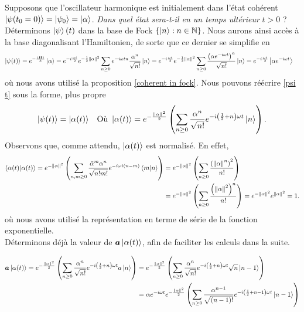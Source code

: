 \documentclass[11pt,oneside,a4paper]{article}
\newcommand{\h}{\ensuremath{\hbar}}
\begin{document}
Supposons que l'oscillateur harmonique est initialement dans l'état cohérent $\ket{\psi (t_0 = 0)} = \ket{\psi_0} = \ket{\alpha}$. \emph{Dans quel état sera-t-il en un temps ultérieur} $t>0$ ? Déterminons $\ket{\psi} (t)$ dans la base de Fock $\left\{\ket{n} : n\in\mathbb{N}\right\}$. Nous aurons ainsi accès à la base diagonalisant l'Hamiltonien, de sorte que ce dernier se simplifie en
\begin{align}
  \ket{\psi(t)} = e^{-\frac{i\bm{H}t}{\h}}\ket{\alpha} &= e^{-i\frac{\omega t}{2}}e^{-\frac{1}{2}\norm{\alpha}^2}\sum_{n\geq 0}e^{-i\omega tn}\frac{\alpha^n}{\sqrt{n!}}\ket{n}
  = e^{-i\frac{\omega t}{2}}e^{-\frac{1}{2}\norm{\alpha}^2}\sum_{n\geq 0}\frac{\left(\alpha e^{-i\omega t}\right)^n}{\sqrt{n!}}\ket{n}
  = e^{-i\frac{\omega t}{2}}\ket{\alpha e^{-i\omega t}}\label{psi t}
\end{align}
où nous avons utilisé la proposition \eqref{coherent in fock}. Nous pouvons réécrire \eqref{psi t} sous la forme, plus propre
\begin{align*}
  \ket{\psi(t)} &= \ket{\alpha(t)} &\text{Où }\ket{\alpha(t)} = e^{-\frac{\norm{\alpha}^2}{2}}\left(\sum_{n\geq 0}\frac{\alpha^n}{\sqrt{n!}}e^{-i\left(\frac{1}{2}+n\right)\omega t}\ket{n}\right).
\end{align*}
Observons que, comme attendu, $\ket{\alpha(t)}$ est normalisé. En effet,
\begin{align*}
  \braket{\alpha(t)} = e^{-\norm{\alpha}^2}\left(\sum_{n,m\geq 0}\frac{\bar{\alpha}^m\alpha^n}{\sqrt{n!m!}}e^{-i\omega t\left(n-m\right)}\braket{m}{n}\right)
  &= e^{-\norm{\alpha}^2}\left(\sum_{n\geq 0}\frac{\left(\norm{\alpha}^n\right)^2}{n!}\right)\\
  &= e^{-\norm{\alpha}^2}\left(\sum_{n\geq 0}\frac{\left(\norm{\alpha}^2\right)^n}{n!}\right) = e^{-\norm{\alpha}^2}e^{\norm{\alpha}^2} = 1.
\end{align*}
où nous avons utilisé la représentation en terme de série de la fonction exponentielle.\\

Déterminons déjà la valeur de $\bm{a}\ket{\alpha(t)}$, afin de faciliter les calculs dans la suite. 

\begin{align*}
  \bm{a}\ket{\alpha(t)} = e^{-\frac{\norm{\alpha}^2}{2}}\left(\sum_{n\geq 0}\frac{\alpha^n}{\sqrt{n!}}e^{-i\left(\frac{1}{2}+n\right)\omega t}a\ket{n}\right)
  &= e^{-\frac{\norm{\alpha}^2}{2}}\left(\sum_{n\geq 0}\frac{\alpha^n}{\sqrt{n!}}e^{-i\left(\frac{1}{2}+n    \right)\omega t}\sqrt{n}\ket{n-1}\right)\\
  &= \alpha e^{-i\omega t}e^{-\frac{\norm{\alpha}^2}{2}}\left(\sum_{n\geq 0}\frac{\alpha^{n-1}}{\sqrt{(n-1)!}}e^{-i\left(\frac{1}{2}+n-1\right)\omega t}\ket{n-1}\right)
\end{align*}
\end{document}
